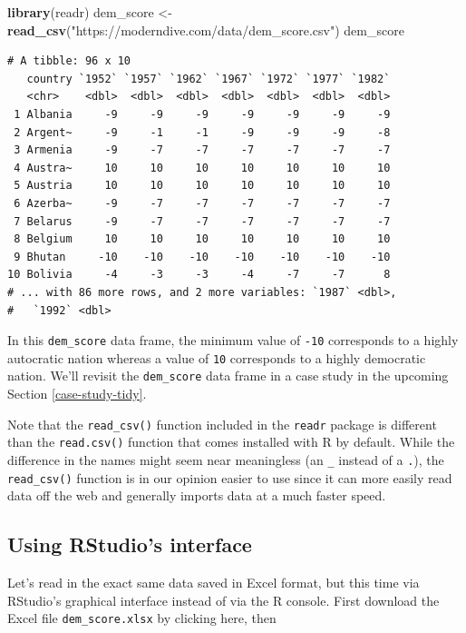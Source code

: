 \documentclass[12pt, krantz2,]{krantz}
\makeatletter
\newenvironment{Shaded}{\begin{snugshade}}{\end{snugshade}}
\newcommand{\KeywordTok}[1]{\textcolor[rgb]{0.27,0.27,0.27}{\textbf{#1}}}
\newcommand{\NormalTok}[1]{#1}
\newcommand{\StringTok}[1]{\textcolor[rgb]{0.5,0.5,0.5}{#1}}
\newenvironment{kframe}{%
\medskip{}
\setlength{\fboxsep}{.8em}
 \def\at@end@of@kframe{}%
 \ifinner\ifhmode%
  \def\at@end@of@kframe{\end{minipage}}%
  \begin{minipage}{\columnwidth}%
 \fi\fi%
 \def\FrameCommand##1{\hskip\@totalleftmargin \hskip-\fboxsep
 \colorbox{shadecolor}{##1}\hskip-\fboxsep
     \hskip-\linewidth \hskip-\@totalleftmargin \hskip\columnwidth}%
 \MakeFramed {\advance\hsize-\width
   \@totalleftmargin\z@ \linewidth\hsize
   \@setminipage}}%
 {\par\unskip\endMakeFramed%
 \at@end@of@kframe}
\renewenvironment{Shaded}{\begin{kframe}}{\end{kframe}}
\makeatother
\begin{document}
\begin{Shaded}
\begin{Highlighting}[]
\KeywordTok{library}\NormalTok{(readr)}
\NormalTok{dem_score <-}\StringTok{ }\KeywordTok{read_csv}\NormalTok{(}\StringTok{"https://moderndive.com/data/dem_score.csv"}\NormalTok{)}
\NormalTok{dem_score}
\end{Highlighting}
\end{Shaded}

\begin{verbatim}
# A tibble: 96 x 10
   country `1952` `1957` `1962` `1967` `1972` `1977` `1982`
   <chr>    <dbl>  <dbl>  <dbl>  <dbl>  <dbl>  <dbl>  <dbl>
 1 Albania     -9     -9     -9     -9     -9     -9     -9
 2 Argent~     -9     -1     -1     -9     -9     -9     -8
 3 Armenia     -9     -7     -7     -7     -7     -7     -7
 4 Austra~     10     10     10     10     10     10     10
 5 Austria     10     10     10     10     10     10     10
 6 Azerba~     -9     -7     -7     -7     -7     -7     -7
 7 Belarus     -9     -7     -7     -7     -7     -7     -7
 8 Belgium     10     10     10     10     10     10     10
 9 Bhutan     -10    -10    -10    -10    -10    -10    -10
10 Bolivia     -4     -3     -3     -4     -7     -7      8
# ... with 86 more rows, and 2 more variables: `1987` <dbl>,
#   `1992` <dbl>
\end{verbatim}

In this \texttt{dem\_score} data frame, the minimum value of \texttt{-10} corresponds to a highly autocratic nation whereas a value of \texttt{10} corresponds to a highly democratic nation. We'll revisit the \texttt{dem\_score} data frame in a case study in the upcoming Section \ref{case-study-tidy}.

Note that the \texttt{read\_csv()} function included in the \texttt{readr} package is different than the \texttt{read.csv()} function that comes installed with R by default. While the difference in the names might seem near meaningless (an \texttt{\_} instead of a \texttt{.}), the \texttt{read\_csv()} function is in our opinion easier to use since it can more easily read data off the web and generally imports data at a much faster speed.

\hypertarget{using-rstudios-interface}{%
\subsection{Using RStudio's interface}\label{using-rstudios-interface}}

Let's read in the exact same data saved in Excel format, but this time via RStudio's graphical interface instead of via the R console. First download the Excel file \texttt{dem\_score.xlsx} by clicking here, then
\end{document}
